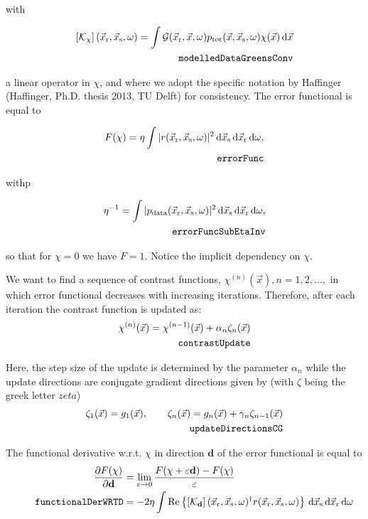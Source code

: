 \documentclass[10pt,a4paper]{article}
\newcommand{\partder}[2]{\ensuremath{\frac{\partial #1}{\partial #2}}}
\newcommand{\df}[1]{\, \ensuremath{\mbox{d}#1}}
\newcommand{\real}[1]{\text{Re} \left\{ #1 \right\}}
\newcommand{\xs}{\vec{x}_\text{s}}
\newcommand{\xr}{\vec{x}_\text{r}}
\newcommand{\x}{\vec{x}}
\begin{document}
with

\begin{align} \label{eq:modelledDataGreensConv} \left[\mathcal{K}_\chi \right](\xr,
\xs, \omega) = \int \mathcal{G}(\xr, \x, \omega) p_\text{tot}(\x, \xs,
\omega) \chi(\x) \df{\x}\\
\tag*{\texttt{modelledDataGreensConv}}
\end{align}

a linear operator in $\chi$, and where we adopt the specific notation
by Haffinger (Haffinger, Ph.D. thesis 2013, TU Delft) for consistency.
The error functional is equal to

\begin{align} \label{eq:errorFunc} F(\chi) = \eta \int |r(\xr, \xs,
\omega)|^2 \df{\vec{x}_\text{s}} \df{\xr}
\df{\omega},\\
\tag*{\texttt{errorFunc}}
\end{align}

withp	

\begin{align} \label{eq:errorFuncSubEtaInv} \eta^{-1} = \int | p_\text{data}(\xr,
\xs, \omega) |^2 \df{\xs} \df{\xr} \df{\omega}, \\
\tag*{\texttt{errorFuncSubEtaInv}} 
 \end{align}

so that for $\chi = 0$ we have $F = 1$. Notice the implicit dependency
on $\chi$.

We want to find a sequence of contrast functions,
$\chi^{(n)}(\vec{x}), n = 1,2,...,$ in which error functional
decreases with increasing iterations. Therefore, after each iteration
the contrast function is updated as:
\begin{align} \label{eq:contrastUpdate} \chi^{(n)}(\vec{x}) =
\chi^{(n-1)}(\vec{x}) + \alpha_n\zeta_n(\vec{x})\\
\tag*{\texttt{contrastUpdate}}
\end{align}

Here, the step size of the update is determined by the parameter
$\alpha_n$ while the update directions are conjugate gradient
directions given by (with $\zeta$ being the greek letter $zeta$)
\begin{align} \label{eq:updateDirectionsCG}\zeta_1(\vec{x}) = g_1(\vec{x}), \qquad \zeta_n(\vec{x}) = g_n(\vec{x}) + \gamma_n\zeta_{n-1}(\vec{x})\\
\tag*{\texttt{updateDirectionsCG}}
\end{align}

The functional derivative w.r.t. $\chi$ in direction $\mathbf{d}$ of
the error functional is equal to
\begin{align}
\label{eq:functionalDerWRTD}
\partder{F(\mathbf{\chi})}{\mathbf{d}} & =
\lim_{\varepsilon \rightarrow 0} \frac{F(\mathbf{\chi} + \varepsilon
\mathbf{d}) - F(\mathbf{\chi})}{\varepsilon} \\
\tag*{\texttt{functionalDerWRTD}}
& = -2 \eta \int \real{\left[\mathcal{K}_\mathbf{d} \right](\xr, \xs,
\omega)^{\dagger} r (\xr, \xs, \omega)} \df{\xs} \df{\xr} \df{\omega}
\end{align}
\end{document}
